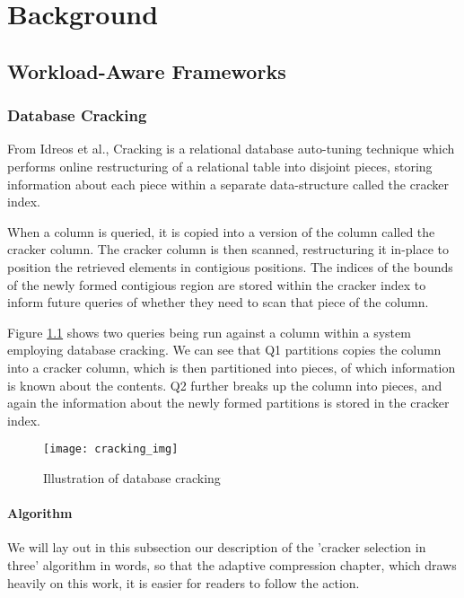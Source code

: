 \chapter{Background}

\label{ch:background}

\section{Workload-Aware Frameworks}

\subsection{Database Cracking}

From Idreos et al., Cracking is a relational database auto-tuning technique which performs online
restructuring of a relational table into disjoint pieces, storing information about each piece within
a separate data-structure called the cracker index.

When a column is queried, it is copied into a version of the column called the cracker column. The
cracker column is then scanned, restructuring it in-place to position the retrieved elements in
contigious positions. The indices of the bounds of the newly formed contigious region are stored
within the cracker index to inform future queries of whether they need to scan that piece of the
column.

Figure \ref{fig:cracking_img} shows two queries being run against a column within a system employing
database cracking. We can see that Q1 partitions copies the column into a cracker column, which is
then partitioned into pieces, of which information is known about the contents. Q2 further breaks
up the column into pieces, and again the information about the newly formed partitions is stored
in the cracker index.

\begin{figure}[h]
  \texttt{[image: cracking\_img]}
  \caption{Illustration of database cracking}
  \label{fig:cracking_img}
\end{figure}

\subsubsection{Algorithm}

We will lay out in this subsection our description of the 'cracker selection in three' algorithm
in words, so that the adaptive compression chapter, which draws heavily on this work, it is easier
for readers to follow the action.

